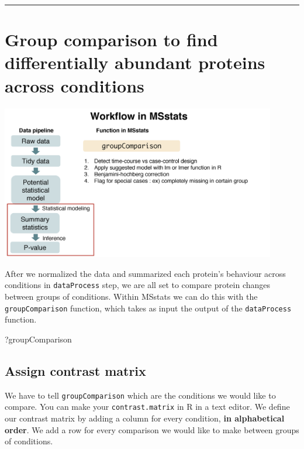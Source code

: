 \documentclass[]{book}
\newenvironment{Shaded}{\begin{snugshade}}{\end{snugshade}}
\newcommand{\NormalTok}[1]{#1}
\begin{document}
\begin{center}\rule{0.5\linewidth}{\linethickness}\end{center}

\hypertarget{group-comparison-to-find-differentially-abundant-proteins-across-conditions}{%
\section{Group comparison to find differentially abundant proteins across conditions}\label{group-comparison-to-find-differentially-abundant-proteins-across-conditions}}

\includegraphics[width=0.9\textwidth,height=\textheight]{img/MSstats_groupComparison.png}

After we normalized the data and summarized each protein's behaviour across conditions in \texttt{dataProcess} step, we are all set to compare protein changes between groups of conditions. Within MSstats we can do this with the \texttt{groupComparison} function, which takes as input the output of the \texttt{dataProcess} function.

\begin{Shaded}
\begin{Highlighting}[]
\NormalTok{?groupComparison}
\end{Highlighting}
\end{Shaded}

\hypertarget{assign-contrast-matrix}{%
\subsection{Assign contrast matrix}\label{assign-contrast-matrix}}

We have to tell \texttt{groupComparison} which are the conditions we would like to compare.
You can make your \texttt{contrast.matrix} in R in a text editor. We define our contrast matrix by adding a column for every condition, \textbf{in alphabetical order}. We add a row for every comparison we would like to make between groups of conditions.
\end{document}
